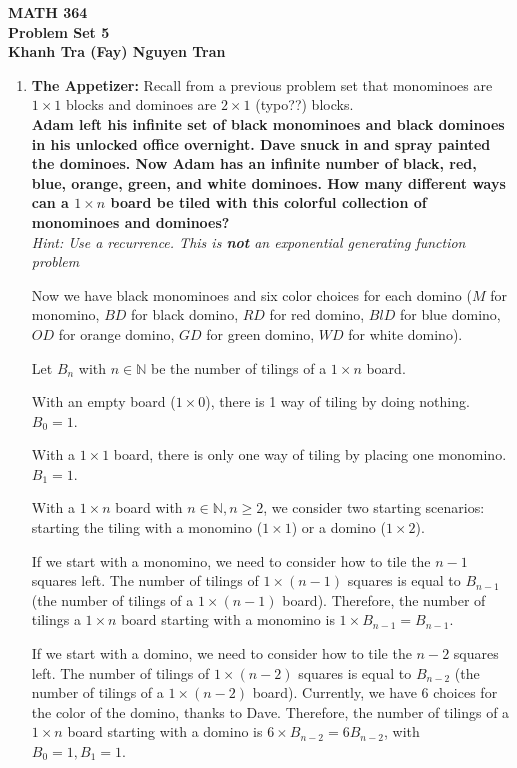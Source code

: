 \documentclass[10pt]{article}
\begin{document}
\begin{center}
\textbf{MATH 364} \\
\textbf{Problem Set 5} \\
\textbf{Khanh Tra (Fay) Nguyen Tran}
\end{center}

\begin{enumerate}

\item {\bf The Appetizer:}
Recall from a previous problem set that monominoes are $1\times 1$ blocks and dominoes are $2 \times 1$ (typo??) blocks.\\
\textbf{Adam left his infinite set of black monominoes and black dominoes in his unlocked office overnight.  Dave snuck in and spray painted the dominoes.  Now Adam has an infinite number of black, red, blue,
orange, green, and white dominoes. How many different ways can a $1\times n$ board be tiled with this colorful collection of monominoes and dominoes?}\\
{\footnotesize \it Hint: Use a recurrence.  This is {\bf not} an exponential generating function problem}

Now we have black monominoes and six color choices for each domino ($M$ for monomino, $BD$ for black domino, $RD$ for red domino, $BlD$ for blue domino, $OD$ for orange domino, $GD$ for green domino, $WD$ for white domino).

Let $B_n$ with $n \in \mathbb{N}$ be the number of tilings of a $1 \times n$ board.

With an empty board ($1 \times 0$), there is 1 way of tiling by doing nothing. $B_0 = 1$.

With a $1 \times 1$ board, there is only one way of tiling by placing one monomino. $B_1 = 1$.

With a $1 \times n$ board with $n \in \mathbb{N}, n \geq 2$, we consider two starting scenarios: starting the tiling with a monomino ($1 \times 1$) or a domino ($1 \times 2$). 
 
If we start with a monomino, we need to consider how to tile the $n - 1$ squares left. The number of tilings of $1 \times (n - 1)$ squares is equal to $B_{n-1}$ (the number of tilings of a $1 \times (n-1)$ board). Therefore, the number of tilings a $1 \times n$ board starting with a monomino is $1 \times B_{n-1} = B_{n-1}$.

If we start with a domino, we need to consider how to tile the $n - 2$ squares left. The number of tilings of $1 \times (n - 2)$ squares is equal to $B_{n-2}$ (the number of tilings of a $1 \times (n-2)$ board). Currently, we have 6 choices for the color of the domino, thanks to Dave. Therefore, the number of tilings of a $1 \times n$ board starting with a domino is $6 \times B_{n-2} = 6B_{n-2}$, with $B_0 = 1, B_1=1$.


\end{enumerate}
\end{document}
